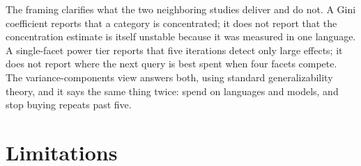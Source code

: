 \documentclass[pdflatex,sn-mathphys-num]{sn-jnl}
\begin{document}
The framing clarifies what the two neighboring studies deliver and do not. A Gini coefficient reports that a category is concentrated; it does not report that the concentration estimate is itself unstable because it was measured in one language. A single-facet power tier reports that five iterations detect only large effects; it does not report where the next query is best spent when four facets compete. The variance-components view answers both, using standard generalizability theory, and it says the same thing twice: spend on languages and models, and stop buying repeats past five.

\section{Limitations}\label{limitations}
\end{document}
